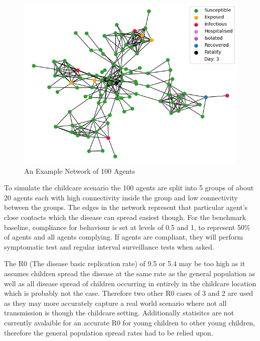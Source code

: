 \documentclass{article}
\begin{document}
\begin{figure}[h!]
\centering
\includegraphics[width= 12cm]{network}
\caption{An Example Network of 100 Agents}
\end{figure}


To simulate the childcare scenario the 100 agents are split into 5 groups of about 20 agents each with high connectivity inside the group and low connectivity between the groups. The edges in the network represent that particular agent's close contacts which the disease can spread easiest though. For the benchmark baseline, compliance for behaviour is set at levels of 0.5 and 1, to represent 50\% of agents and all agents complying. If agents are compliant, they will perform symptomatic test and regular interval surveillance tests when asked.\newline

The R0 (The disease basic replication rate) of 9.5 or 5.4 may be too high as it assumes children spread the disease at the same rate as the general population as well as all disease spread of children occurring in entirely in the childcare location which is probably not the case. Therefore two other R0 cases of 3 and 2 are used as they may more accurately capture a real world scenario where not all transmission is though the childcare setting. Additionally statisitcs are not currently avalaible for an accurate R0 for young children to other young children, therefore the general population spread rates had to be relied upon. \newline
\end{document}

